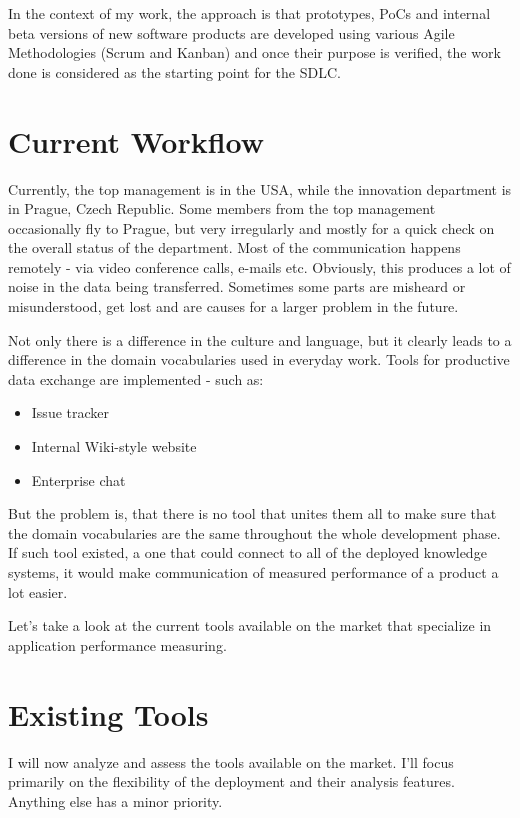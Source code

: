 In the context of my work, the approach is that prototypes, PoCs and internal beta versions of new software products are developed using various Agile Methodologies (Scrum and Kanban) and once their purpose is verified, the work done is considered as the starting point for the SDLC.

\section{Current Workflow}

Currently, the top management is in the USA, while the innovation department is in Prague, Czech Republic. Some members from the top management occasionally fly to Prague, but very irregularly and mostly for a quick check on the overall status of the department. Most of the communication happens remotely - via video conference calls, e-mails etc. Obviously, this produces a lot of noise in the data being transferred. Sometimes some parts are misheard or misunderstood, get lost and are causes for a larger problem in the future.

Not only there is a difference in the culture and language, but it clearly leads to a difference in the domain vocabularies used in everyday work. Tools for productive data exchange are implemented - such as:

\begin{itemize}
	\item Issue tracker
	\item Internal Wiki-style website
	\item Enterprise chat
\end{itemize}

But the problem is, that there is no tool that unites them all to make sure that the domain vocabularies are the same throughout the whole development phase. If such tool existed, a one that could connect to all of the deployed knowledge systems, it would make communication of measured performance of a product a lot easier.

Let's take a look at the current tools available on the market that specialize in application performance measuring.

\section{Existing Tools}

I will now analyze and assess the tools available on the market. I'll focus primarily on the flexibility of the deployment and their analysis features. Anything else has a minor priority.

